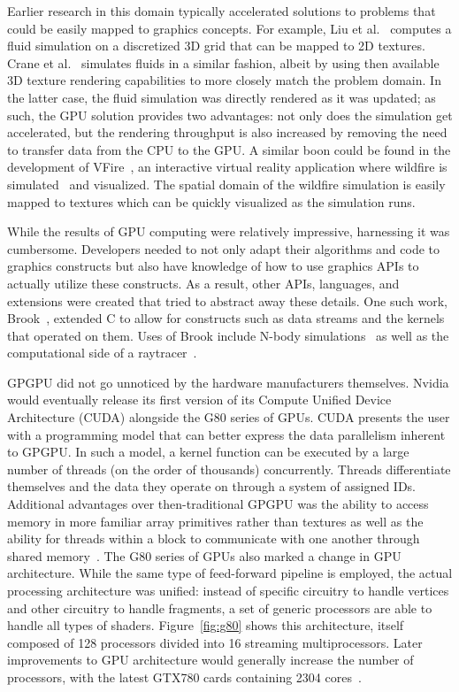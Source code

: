 Earlier research in this domain typically accelerated solutions
to problems that could be easily mapped to graphics concepts. For
example, Liu et al.~\cite{3d_fluids} computes a fluid simulation on
a discretized 3D grid that can be mapped to 2D textures. Crane et
al.~\cite{crane_fluids} simulates fluids in a similar fashion, albeit by
using then available 3D texture rendering capabilities to more closely
match the problem domain. In the latter case, the fluid simulation
was directly rendered as it was updated; as such, the GPU solution
provides two advantages: not only does the simulation get accelerated,
but the rendering throughput is also increased by removing the need to
transfer data from the CPU to the GPU. A similar boon could be found
in the development of VFire~\cite{vfire}, an interactive virtual reality
application where wildfire is simulated~\cite{gpu_fire} and visualized.
The spatial domain of the wildfire simulation is easily mapped to textures
which can be quickly visualized as the simulation runs.

While the results of GPU computing were relatively impressive, harnessing
it was cumbersome. Developers needed to not only adapt their algorithms
and code to graphics constructs but also have knowledge of how to use
graphics APIs to actually utilize these constructs. As a result, other
APIs, languages, and extensions were created that tried to abstract away
these details. One such work, Brook~\cite{brook}, extended C to allow
for constructs such as data streams and the kernels that operated on
them. Uses of Brook include N-body simulations~\cite{gpu_nbody} as well
as the computational side of a raytracer~\cite{brook_raytracer}.

GPGPU did not go unnoticed by the hardware manufacturers
themselves. Nvidia would eventually release its first version of its
Compute Unified Device Architecture (CUDA) alongside the G80 series of
GPUs. CUDA presents the user with a programming model that can better
express the data parallelism inherent to GPGPU. In such a model, a
kernel function can be executed by a large number of threads (on the
order of thousands) concurrently.  Threads differentiate themselves and
the data they operate on through a system of assigned IDs. Additional
advantages over then-traditional GPGPU was the ability to access memory
in more familiar array primitives rather than textures as well as the
ability for threads within a block to communicate with one another
through shared memory~\cite{cuda_g80}. The G80 series of GPUs also
marked a change in GPU architecture. While the same type of feed-forward
pipeline is employed, the actual processing architecture was unified:
instead of specific circuitry to handle vertices and other circuitry
to handle fragments, a set of generic processors are able to handle all
types of shaders. Figure~\ref{fig:g80} shows this architecture, itself
composed of 128 processors divided into 16 streaming multiprocessors. Later
improvements to GPU architecture would generally increase the number of
processors, with the latest GTX780 cards containing 2304 cores~\cite{gtx780}.

